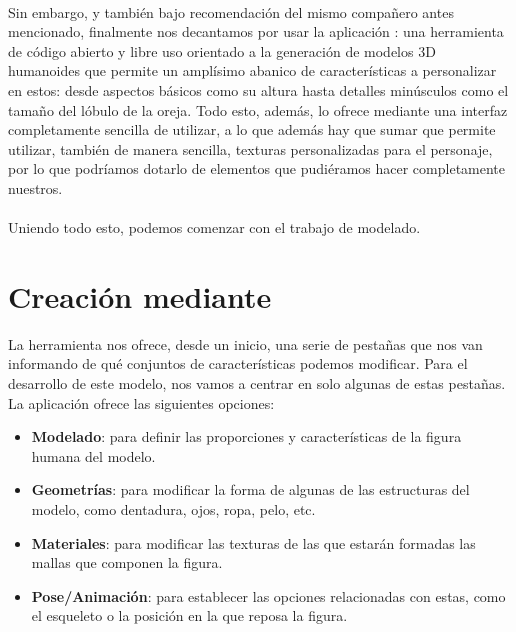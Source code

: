 \documentclass{subfiles}
\begin{document}
    \paragraph{}
    Sin embargo, y también bajo recomendación del mismo compañero antes mencionado, finalmente nos decantamos por usar la aplicación \makehuman \cite{web:makehuman}: una herramienta de código abierto y libre uso orientado a la generación de modelos 3D humanoides que permite un amplísimo abanico de características a personalizar en estos: desde aspectos básicos como su altura hasta detalles minúsculos como el tamaño del lóbulo de la oreja. Todo esto, además, lo ofrece mediante una interfaz completamente sencilla de utilizar, a lo que además hay que sumar que permite utilizar, también de manera sencilla, texturas personalizadas para el personaje, por lo que podríamos dotarlo de elementos que pudiéramos hacer completamente nuestros.

    \paragraph{}
    Uniendo todo esto, podemos comenzar con el trabajo de modelado.

    \section{Creación mediante \makehuman}
    \label{sec:creacion_mediante_makehuman}

    La herramienta \makehuman nos ofrece, desde un inicio, una serie de pestañas que nos van informando de qué conjuntos de características podemos modificar. Para el desarrollo de este modelo, nos vamos a centrar en solo algunas de estas pestañas. La aplicación ofrece las siguientes opciones:

    \begin{itemize}
        \item \textbf{Modelado}: para definir las proporciones y características de la figura humana del modelo.
        \item \textbf{Geometrías}: para modificar la forma de algunas de las estructuras del modelo, como dentadura, ojos, ropa, pelo, etc.
        \item \textbf{Materiales}: para modificar las texturas de las que estarán formadas las mallas que componen la figura.
        \item \textbf{Pose/Animación}: para establecer las opciones relacionadas con estas, como el esqueleto o la posición en la que reposa la figura.
    \end{itemize}
\end{document}
